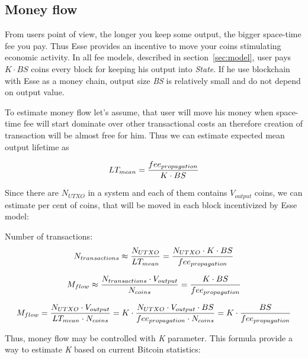 \documentclass[]{article}   %
\newcommand{\authnote}[2]{\marginpar{\parbox{\marginparwidth}{\tiny %
  \textsf{#1 {\textcolor{blue}{notes: #2}}}}}%
  \textcolor{blue}{\textbf{\dag}}}
\newcommand{\authnote}[2]{
  \textsf{#1 \textcolor{blue}{: #2}}}
\newcommand{\authnote}[2]{}
\newcommand{\dnote}[1]{{\authnote{\textcolor{blue}{Dima notes}}{#1}}}
\newcommand{\esse}{Esse}
\newcommand{\state}{\textit{State}}
\begin{document}
\subsection{Money flow}
\label{sec:flow}

From users point of view, the longer you keep some output, the bigger space-time fee you pay. Thus \esse{} provides an incentive to move your coins stimulating economic activity. In all fee models, described in section~\ref{sec:model}, user pays ${K \cdot BS}$ coins every block for keeping his output into \state{}. If he use blockchain with \esse{} as a money chain, output size \textit{BS} is relatively small and do not depend on output value.

To estimate money flow let's assume, that user will move his money when space-time fee will start dominate over other transactional costs an therefore creation of transaction will be almost free for him. Thus we can estimate expected mean output lifetime as

\begin{equation}
\label{eq:ltmean}
LT_{mean}={fee_{propagation} \over K \cdot BS}
\end{equation}

Since there are $N_{UTXO}$ in a system and each of them contains $V_{output}$ coins, we can estimate per cent of coins, that will be moved in each block incentivized by \esse{} model:

\dnote{start: estimate number of transactions per block}
Number of transactions:
\begin{equation}
N_{transactions} \approx {N_{UTXO} \over LT_{mean}} = {N_{UTXO} \cdot K \cdot BS \over fee_{propagation}}
\end{equation}

\begin{equation}
M_{flow} \approx { N_{transactions} \cdot V_{output} \over N_{coins}} = {K \cdot BS \over fee_{propagation}}
\end{equation}
\dnote{end: estimate number of transactions per block}

\begin{equation}
M_{flow}={N_{UTXO} \cdot V_{output} \over LT_{mean} \cdot N_{coins}}=K \cdot {N_{UTXO} \cdot V_{output} \cdot BS \over fee_{propagation} \cdot N_{coins}} = K \cdot {BS \over fee_{propagation}}
\end{equation}

Thus, money flow may be controlled with \textit{K} parameter. This formula provide a way to estimate \textit{K} based on current Bitcoin statistics:
\end{document}
